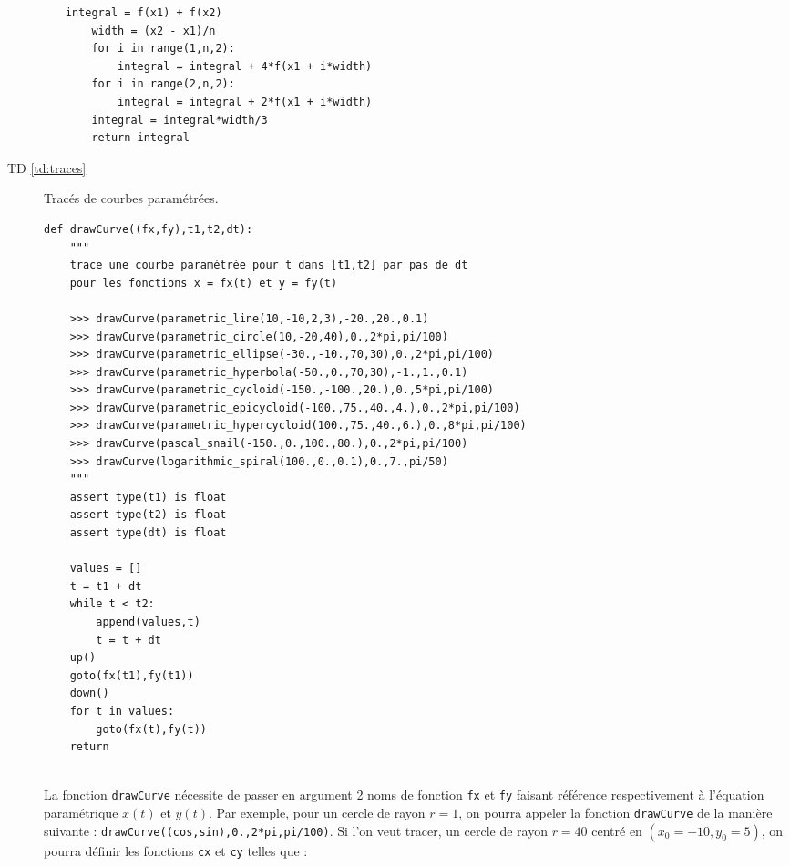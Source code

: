 \begin{description}
\begin{enumerate}
\begin{py}{14.5cm}
\begin{lstlisting}[title={\bf Intégration : méthode de Simpson}]
    integral = f(x1) + f(x2)
    width = (x2 - x1)/n
    for i in range(1,n,2):
        integral = integral + 4*f(x1 + i*width)
    for i in range(2,n,2):
        integral = integral + 2*f(x1 + i*width)
    integral = integral*width/3
    return integral
	\end{lstlisting}
	\end{py}
	\end{enumerate}

\newpage
\item[TD \ref{td:traces}] Tracés de courbes paramétrées.\\
	\begin{py}{15cm}
	\begin{lstlisting}
def drawCurve((fx,fy),t1,t2,dt):
    """
    trace une courbe paramétrée pour t dans [t1,t2] par pas de dt
    pour les fonctions x = fx(t) et y = fy(t)

    >>> drawCurve(parametric_line(10,-10,2,3),-20.,20.,0.1)
    >>> drawCurve(parametric_circle(10,-20,40),0.,2*pi,pi/100)
    >>> drawCurve(parametric_ellipse(-30.,-10.,70,30),0.,2*pi,pi/100)
    >>> drawCurve(parametric_hyperbola(-50.,0.,70,30),-1.,1.,0.1)
    >>> drawCurve(parametric_cycloid(-150.,-100.,20.),0.,5*pi,pi/100)
    >>> drawCurve(parametric_epicycloid(-100.,75.,40.,4.),0.,2*pi,pi/100)
    >>> drawCurve(parametric_hypercycloid(100.,75.,40.,6.),0.,8*pi,pi/100)
    >>> drawCurve(pascal_snail(-150.,0.,100.,80.),0.,2*pi,pi/100)
    >>> drawCurve(logarithmic_spiral(100.,0.,0.1),0.,7.,pi/50)
    """
    assert type(t1) is float
    assert type(t2) is float
    assert type(dt) is float

    values = []
    t = t1 + dt
    while t < t2:
        append(values,t)
        t = t + dt
    up()
    goto(fx(t1),fy(t1))
    down()
    for t in values:
        goto(fx(t),fy(t))
    return
	\end{lstlisting}
	\end{py}\\[1mm]
	La fonction {\tt drawCurve} nécessite de passer en argument 2 noms de fonction
	{\tt fx} et {\tt fy} faisant référence respectivement à l'équation paramétrique
	$x(t)$ et $y(t)$.  Par exemple, pour un cercle de rayon $r=1$, on pourra appeler
	la fonction {\tt drawCurve} de la manière suivante : 
	{\tt drawCurve((cos,sin),0.,2*pi,pi/100)}. Si l'on veut tracer, un cercle de rayon 
	$r = 40$ centré en $(x_0=-10,y_0=5)$, on pourra définir les fonctions {\tt cx}
	et {\tt cy} telles que :


\end{description}
